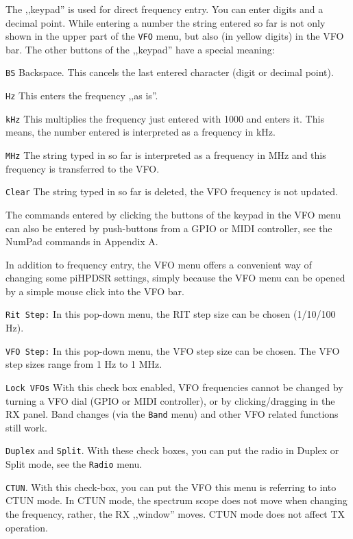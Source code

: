 \documentclass[12pt]{book}
\def\rett#1{\texttt{\color{red}#1}}
\def\bltt#1{\texttt{\color{blue}#1}}
\begin{document}
The ,,keypad'' is used for direct frequency entry. You can enter
digits and a decimal point. While entering a number the string
entered so far is not only shown in the upper part of the
\bltt{VFO} menu, but also (in yellow digits) in the VFO bar.
The other buttons of the ,,keypad'' have a special meaning:



\rett{BS} Backspace. This cancels the last entered character
(digit or decimal point).

\rett{Hz} This enters the frequency ,,as is''.

\rett{kHz} This multiplies the frequency just entered with 1000 and
enters it. This means, the number entered is interpreted as a
frequency in kHz.

\rett{MHz} The string typed in so far is interpreted as a frequency in MHz
and this frequency is transferred to the VFO.

\rett{Clear} The string typed in so far is deleted, the VFO frequency is not
updated.

The commands entered by clicking the buttons of the keypad in the VFO menu
can also be entered by push-buttons from a GPIO or MIDI controller, see
the NumPad commands in Appendix A.

In addition to frequency entry, the VFO menu offers a convenient way of changing
some piHPDSR settings, simply because the VFO menu can be opened by a simple
mouse click into the VFO bar.

\rett{Rit Step:} In this pop-down menu, the RIT step size can be chosen (1/10/100 Hz).

\rett{VFO Step:} In this pop-down menu, the VFO step size can be chosen. The VFO step
sizes range from 1 Hz to 1 MHz.

\rett{Lock VFOs} With this check box enabled, VFO frequencies cannot be changed by
turning a VFO dial (GPIO or MIDI controller), or by clicking/dragging in the RX panel.
Band changes (via the \bltt{Band} menu) and other VFO related functions still work.

\rett{Duplex} and \rett{Split}. With these check boxes, you can put the radio
in Duplex or Split mode, see the \bltt{Radio} menu.

\rett{CTUN}. With this check-box, you can put the VFO this menu is referring to into
CTUN mode. In CTUN mode, the spectrum scope does not move when changing the frequency,
rather, the RX ,,window'' moves. CTUN mode does not affect TX operation.

\end{document}
